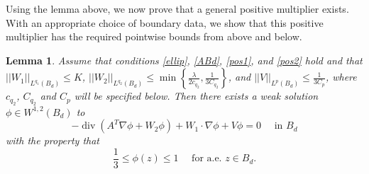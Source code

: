 \documentclass[12pt,reqno]{amsart}
\theoremstyle{plain}
\newtheorem{lem}{Lemma}
\theoremstyle{definition}
\DeclareMathOperator{\di}{div}
\newcommand{\la}{\lambda}
\newcommand{\gr}{\nabla}
\newcommand{\norm}[1]{\left\vert \left\vert #1\right\vert\right\vert}
\newcommand{\set}[1]{\left\{#1\right\}}
\newcommand{\pr}[1]{\left( #1 \right) }
\begin{document}
Using the lemma above, we now prove that a general positive multiplier exists.
With an appropriate choice of boundary data, we show that this positive multiplier has the required pointwise bounds from above and below.

\begin{lem}
\label{phiLem}
Assume that conditions \eqref{ellip}, \eqref{ABd}, \eqref{pos1}, and \eqref{pos2} hold and that $\norm{W_1}_{L^{q_1}\pr{B_d}} \le K$, $\norm{W_2}_{L^{q_2}\pr{B_d}} \le \min\set{\frac \la {2 c_{q_2}}, \frac{1}{3C_{q_2}}}$, and $\norm{V}_{L^p\pr{B_d}} \le \frac{1}{3C_p}$, where $c_{q_2}$, $C_{q_2}$ and $C_p$ will be specified below.
Then there exists a weak solution $\phi \in W^{1,2}\pr{B_d}$ to 
\begin{equation}
- \di \pr{A^T \gr \phi + W_2 \phi} + W_1 \cdot \gr \phi + V \phi = 0 \quad \text{ in } B_d
\label{epde4}
\end{equation}
with the property that
\begin{equation}
\frac 1 3 \le \phi\pr{z} \le 1 \quad \text{ for a.e. } z \in B_d.
\label{phiBound}
\end{equation}
\end{lem}
\end{document}
